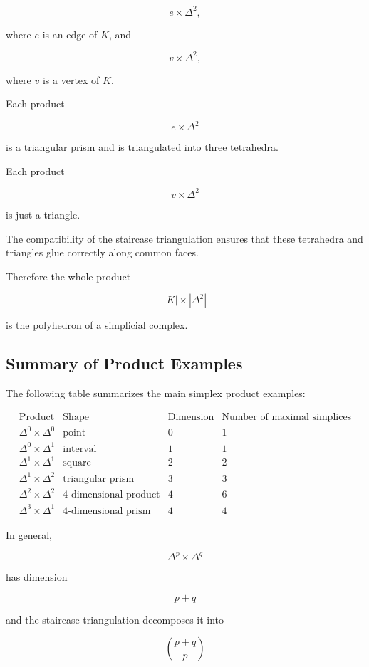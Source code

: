 \documentclass[12pt,a4paper]{article}
\theoremstyle{notespace}
\begin{document}
\[
e\times \Delta^2,
\]

where \(e\) is an edge of \(K\), and

\[
v\times \Delta^2,
\]

where \(v\) is a vertex of \(K\).

Each product

\[
e\times \Delta^2
\]

is a triangular prism and is triangulated into three tetrahedra.

Each product

\[
v\times \Delta^2
\]

is just a triangle.

The compatibility of the staircase triangulation ensures that these tetrahedra and triangles glue correctly along common faces.

Therefore the whole product

\[
|K|\times |\Delta^2|
\]

is the polyhedron of a simplicial complex.

\subsection{Summary of Product Examples}

The following table summarizes the main simplex product examples:

\[
\begin{array}{c|c|c|c}
	\text{Product} & \text{Shape} & \text{Dimension} & \text{Number of maximal simplices} \\
	\hline
	\Delta^0\times\Delta^0 & \text{point} & 0 & 1 \\
	\Delta^0\times\Delta^1 & \text{interval} & 1 & 1 \\
	\Delta^1\times\Delta^1 & \text{square} & 2 & 2 \\
	\Delta^1\times\Delta^2 & \text{triangular prism} & 3 & 3 \\
	\Delta^2\times\Delta^2 & \text{4-dimensional product} & 4 & 6 \\
	\Delta^3\times\Delta^1 & \text{4-dimensional prism} & 4 & 4
\end{array}
\]

In general,

\[
\Delta^p\times \Delta^q
\]

has dimension

\[
p+q
\]

and the staircase triangulation decomposes it into

\[
\binom{p+q}{p}
\]
\end{document}
